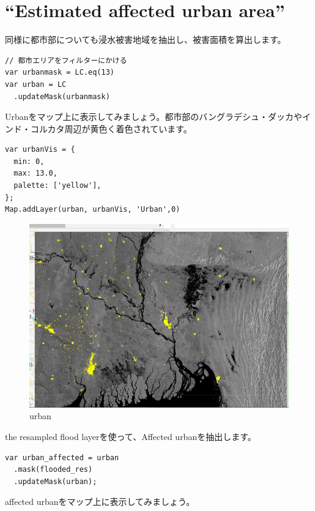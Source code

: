 \documentclass[
]{book}
\begin{document}
\hypertarget{estimated-affected-urban-area}{%
\section{``Estimated affected urban area''}\label{estimated-affected-urban-area}}

同様に都市部についても浸水被害地域を抽出し、被害面積を算出します。

\begin{verbatim}
// 都市エリアをフィルターにかける
var urbanmask = LC.eq(13)
var urban = LC
  .updateMask(urbanmask)
\end{verbatim}

Urbanをマップ上に表示してみましょう。都市部のバングラデシュ・ダッカやインド・コルカタ周辺が黄色く着色されています。

\begin{verbatim}
var urbanVis = {
  min: 0,
  max: 13.0,
  palette: ['yellow'],
};
Map.addLayer(urban, urbanVis, 'Urban',0)
\end{verbatim}

\begin{figure}
\centering
\includegraphics{images/urban.png}
\caption{urban}
\end{figure}

the resampled flood layerを使って、Affected urbanを抽出します。

\begin{verbatim}
var urban_affected = urban
  .mask(flooded_res)
  .updateMask(urban);
\end{verbatim}

affected urbanをマップ上に表示してみましょう。
\end{document}

